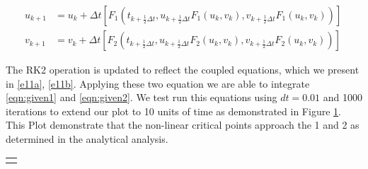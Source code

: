 \documentclass{article}
\begin{document}
\begin{subequations}
\begin{align}
\label{e11a} 
u_{k+1} &= u_k + \Delta t \left[F_1\left(t_{k+\frac{1}{2}\Delta t}, u_{k + \frac{1}{2}\Delta t} F_1(u_k, v_k), v_{k + \frac{1}{2}\Delta t} F_1(u_k, v_k)\right)\right]\\
\label{e11b} 
v_{k+1} &=  v_k + \Delta t \left[F_2\left(t_{k+\frac{1}{2}\Delta t}, u_{k + \frac{1}{2}\Delta t} F_2(u_k, v_k), v_{k + \frac{1}{2}\Delta t} F_2(u_k, v_k)\right)\right]\
\end{align}
\end{subequations}

The RK2 operation is updated to reflect the coupled equations, which we present in \eqref{e11a}, \eqref{e11b}. Applying these two equation we are able to integrate \eqref{eqn:given1} and \eqref{eqn:given2}. We test run this equations using $dt=0.01$ and 1000 iterations to extend our plot to 10 units of time as demonstrated in Figure \ref{fig:timeplot}. This Plot demonstrate that the non-linear critical points approach the 1 and 2 as determined in the analytical analysis.
\begin{table}[H]
\centering
\begin{tabularx}{\columnwidth}{X}
    \centering
    \resizebox{!}{.15\paperheight}{}
    \captionof{figure}{$dt=0.01, $ $iter=1000$}\label{fig:timeplot}
\end{tabularx}
\end{table}
\end{document}
